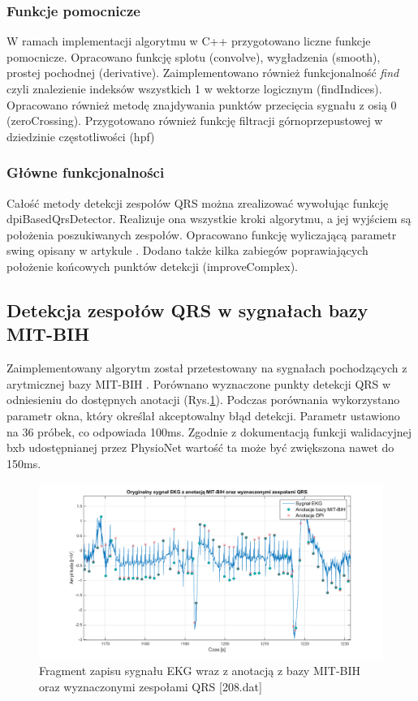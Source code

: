 \documentclass[10pt,a4paper]{article}
\begin{document}
\subsubsection{Funkcje pomocnicze}
W ramach implementacji algorytmu w C++ przygotowano liczne funkcje pomocnicze. Opracowano funkcję splotu (convolve), wygładzenia (smooth), prostej pochodnej (derivative). Zaimplementowano również funkcjonalność  \textit{find} czyli znalezienie indeksów wszystkich 1 w wektorze logicznym (findIndices). Opracowano również metodę znajdywania punktów przecięcia sygnału z osią 0 (zeroCrossing). Przygotowano również funkcję filtracji górnoprzepustowej w dziedzinie częstotliwości (hpf)

\subsubsection{Główne funkcjonalności}
Całość metody detekcji zespołów QRS można zrealizować wywołując funkcję dpiBasedQrsDetector. Realizuje ona wszystkie kroki algorytmu, a jej wyjściem są położenia poszukiwanych zespołów. Opracowano funkcję wyliczającą parametr swing opisany w artykule \cite{dpi}. Dodano także kilka zabiegów poprawiających położenie końcowych punktów detekcji (improveComplex). 
\newpage
\subsection{Detekcja zespołów QRS w sygnałach bazy MIT-BIH} 
Zaimplementowany algorytm został przetestowany na sygnałach pochodzących z arytmicznej bazy MIT-BIH \cite{PhysioNet}. Porównano wyznaczone punkty detekcji QRS w odniesieniu do dostępnych anotacji (Rys.\ref{208img}). Podczas porównania wykorzystano parametr okna, który określał akceptowalny błąd detekcji. Parametr ustawiono na 36 próbek, co odpowiada 100ms. Zgodnie z dokumentacją funkcji walidacyjnej bxb udostępnianej przez PhysioNet wartość ta może być zwiększona nawet do 150ms. 
\begin{figure}[h]
    \centering
    \includegraphics[width=1\textwidth]{img/208.png}
    \caption{Fragment zapisu sygnału EKG wraz z anotacją z bazy MIT-BIH oraz wyznaczonymi zespołami QRS [208.dat]}
    \label{208img}
\end{figure}
\FloatBarrier
\end{document}

